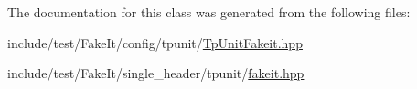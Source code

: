 The documentation for this class was generated from the following files\+:\begin{DoxyCompactItemize}
\item 
include/test/\+Fake\+It/config/tpunit/\mbox{\hyperlink{TpUnitFakeit_8hpp}{Tp\+Unit\+Fakeit.\+hpp}}\item 
include/test/\+Fake\+It/single\+\_\+header/tpunit/\mbox{\hyperlink{single__header_2tpunit_2fakeit_8hpp}{fakeit.\+hpp}}\end{DoxyCompactItemize}
